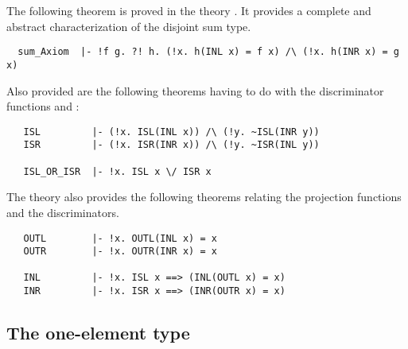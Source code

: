 The following theorem is proved in the theory . It provides a
complete and abstract characterization of the disjoint sum type.

\begin{hol}
\begin{verbatim}
  sum_Axiom  |- !f g. ?! h. (!x. h(INL x) = f x) /\ (!x. h(INR x) = g x)
\end{verbatim}
\end{hol}

\noindent Also provided are the following theorems having to
do with the discriminator functions  and :

\begin{hol}
\begin{verbatim}
   ISL         |- (!x. ISL(INL x)) /\ (!y. ~ISL(INR y))
   ISR         |- (!x. ISR(INR x)) /\ (!y. ~ISR(INL y))

   ISL_OR_ISR  |- !x. ISL x \/ ISR x
\end{verbatim}
\end{hol}

\noindent The  theory also provides the following theorems
relating the projection functions and the discriminators.

\begin{hol}
{\small
\begin{verbatim}
   OUTL        |- !x. OUTL(INL x) = x
   OUTR        |- !x. OUTR(INR x) = x

   INL         |- !x. ISL x ==> (INL(OUTL x) = x)
   INR         |- !x. ISR x ==> (INR(OUTR x) = x)
\end{verbatim}}
\end{hol}

\subsection{The one-element type}%
%
%

